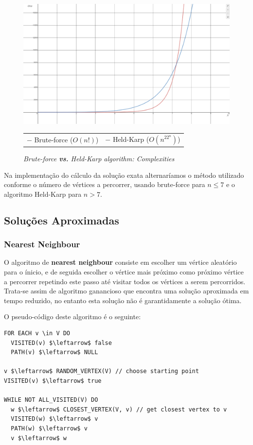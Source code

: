 \documentclass[article, a4paper, 12pt, oneside]{memoir}
\begin{document}
\begin{figure}
\centering
\includegraphics[scale=0.3]{tsp_exact_complexity}
\caption{\emph{Brute-force \textbf{vs.} Held-Karp algorithm: Complexities}}
\begin{tabular}{ l r }
\color{red} $-$ \color{black} Brute-force ($O(n!)$) & \color{blue} $-$ \color{black} Held-Karp ($O(n^22^n)$)
\end{tabular}
\end{figure}

Na implementação do cálculo da solução exata alternaríamos o método utilizado conforme o número de vértices a percorrer, usando brute-force para $n \leq 7$ e o algoritmo Held-Karp para $n > 7$. 

\subsection{Soluções Aproximadas}
\subsubsection{Nearest Neighbour}
O algoritmo de \textbf{nearest neighbour} consiste em escolher um vértice aleatório para o ínicio, e de seguida escolher o vértice mais próximo como próximo vértice a percorrer repetindo este passo até visitar todos os vértices a serem percorridos. Trata-se assim de algoritmo ganancioso que encontra uma solução aproximada em tempo reduzido, no entanto esta solução não é garantidamente a solução ótima.

O pseudo-código deste algoritmo é o seguinte:
\begin{lstlisting}[frame=single, mathescape=true]
FOR EACH v \in V DO
  VISITED(v) $\leftarrow$ false
  PATH(v) $\leftarrow$ NULL

v $\leftarrow$ RANDOM_VERTEX(V) // choose starting point
VISITED(v) $\leftarrow$ true

WHILE NOT ALL_VISITED(V) DO
  w $\leftarrow$ CLOSEST_VERTEX(V, v) // get closest vertex to v
  VISITED(w) $\leftarrow$ v 
  PATH(w) $\leftarrow$ v
  v $\leftarrow$ w
\end{lstlisting}
\end{document}
